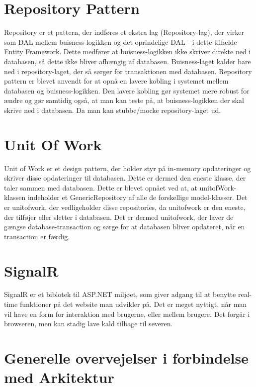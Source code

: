 \section{Repository Pattern}
Repository er et pattern, der indføres et ekstra lag (Repository-lag), der virker som DAL mellem buisness-logikken og det oprindelige DAL - i dette tilfælde Entity Framework. Dette medfører at buisness-logikken ikke skriver direkte ned i databasen, så dette ikke bliver afhængig af databasen. Buisness-laget kalder bare ned i repository-laget, der så sørger for transaktionen med databasen. 
Repository pattern er blevet anvendt for at opnå en lavere kobling i systemet mellem databasen og buisness-logikken. Den lavere kobling gør systemet mere robust for ændre og gør samtidig også, at man kan teste på, at buisness-logikken der skal skrive ned i databasen. Da man kan stubbe/mocke repository-laget ud.

\section{Unit Of Work}
Unit of Work er et design pattern, der holder styr på in-memory opdateringer og skriver disse opdateringer til databasen. Dette er dermed den eneste klasse, der taler sammen med databasen.
Dette er blevet opnået ved at, at unitofWork-klassen indeholder et GenericRepository af alle de forskellige model-klasser. Det er unitofwork, der vedligeholder disse repositories, da unitofwork er den eneste, der tilføjer eller sletter i databasen. Det er dermed unitofwork, der laver de gængse database-transaction og sørge for at databasen bliver opdateret, når en transaction er færdig.

\section{SignalR}
SignalR er et biblotek til ASP.NET miljøet, som giver adgang til at benytte real-time funktioner på det website man udvikler på. Det er meget nyttigt, når man vil have en form for interaktion med brugerne, eller mellem brugere. Det forgår i browseren, men kan stadig lave kald tilbage til severen. 
\section{Generelle overvejelser i forbindelse med Arkitektur}
